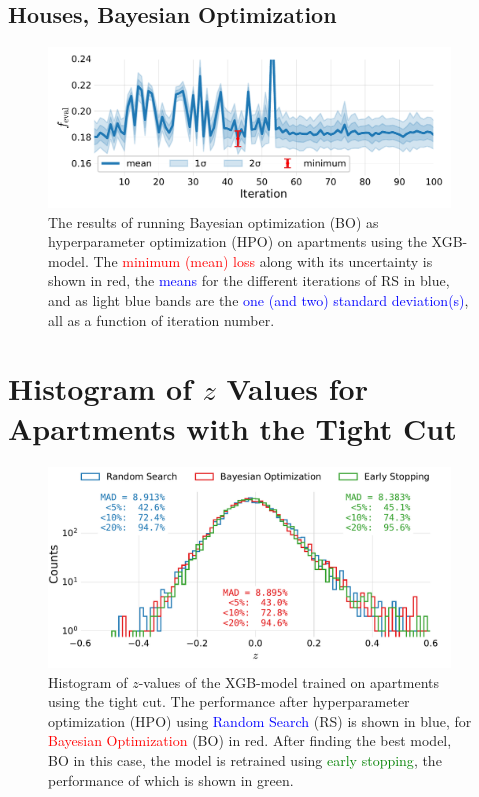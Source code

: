 \FloatBarrier
\subsection*{Houses, Bayesian Optimization}
\begin{figure}[h!]
  \includegraphics[width=0.95\textwidth, trim=0 0 0 0, clip]{figures/housing/Villa_v19_cut_all_Ncols_all_xgb_score_over_time_BO.pdf}
  \caption[Bayesian Optimization Results as a Function of Iteration for Houses]
          {The results of running Bayesian optimization (BO) as hyperparameter optimization (HPO) on apartments using the XGB-model. The \textcolor{red}{minimum (mean) loss} along with its uncertainty is shown in red, the \textcolor{blue}{means} for the different iterations of RS in blue, and as light blue bands are the \textcolor{blue}{one (and two) standard deviation(s)}, all as a function of iteration number.} 
\end{figure}


\FloatBarrier
\section[Histogram of z Values for Apartments with the Tight Cut]{Histogram of $z$ Values for Apartments with the Tight Cut}

\begin{figure}
  \includegraphics[width=0.95\textwidth, trim=0 0 0 0, clip]{figures/housing/Ejerlejlighed_v19_cut_all_Ncols_all_xgb_z_hist_metrics_tight.pdf}
  \caption[Performance of XGB-model on apartment prices]
          {Histogram of $z$-values of the XGB-model trained on apartments using the tight cut. The performance after hyperparameter optimization (HPO) using \textcolor{blue}{Random Search} (RS) is shown in blue, for \textcolor{red}{Bayesian Optimization} (BO) in red. After finding the best model, BO in this case, the model is retrained using \textcolor{green}{early stopping}, the performance of which is shown in green.} 
  \label{fig:h:CV_res_performance_ejer_tight}
\end{figure}

